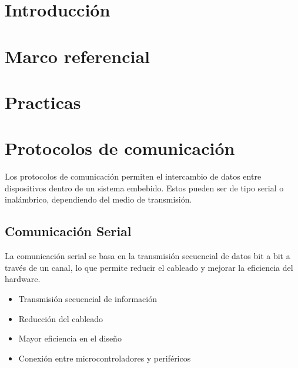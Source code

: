 \documentclass[conference]{IEEEtran}
\begin{document}
\section{Introducción}\label{sec:introduccion}
  

  

\section{Marco referencial}\label{sec:experimental}
    

\section{Practicas}\label{sec:metodologia}
  
  
\section{Protocolos de comunicación}
Los protocolos de comunicación permiten el intercambio de datos entre dispositivos dentro de un sistema embebido. Estos pueden ser de tipo serial o inalámbrico, dependiendo del medio de transmisión.

\subsection{Comunicación Serial}

La comunicación serial se basa en la transmisión secuencial de datos bit a bit a través de un canal, lo que permite reducir el cableado y mejorar la eficiencia del hardware.

\begin{itemize}
    \item Transmisión secuencial de información
    \item Reducción del cableado
    \item Mayor eficiencia en el diseño
    \item Conexión entre microcontroladores y periféricos
\end{itemize}
\end{document}
